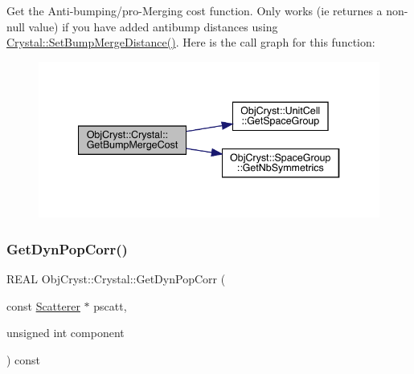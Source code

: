 Get the Anti-\/bumping/pro-\/\+Merging cost function. Only works (ie returnes a non-\/null value) if you have added antibump distances using \mbox{\hyperlink{class_obj_cryst_1_1_crystal_ad77bfe72588a64e306a5514535ed7404}{Crystal\+::\+Set\+Bump\+Merge\+Distance()}}. Here is the call graph for this function\+:
\nopagebreak
\begin{figure}[H]
\begin{center}
\leavevmode
\includegraphics[width=340pt]{class_obj_cryst_1_1_crystal_a9d7a5da6a0618589ee256a5bb8128ffa_cgraph}
\end{center}
\end{figure}
\mbox{\label{class_obj_cryst_1_1_crystal_a9328fa012a60adf6b2b17dcfba9f6906}} 
\subsubsection{\texorpdfstring{GetDynPopCorr()}{GetDynPopCorr()}}
{\footnotesize\ttfamily R\+E\+AL Obj\+Cryst\+::\+Crystal\+::\+Get\+Dyn\+Pop\+Corr (\begin{DoxyParamCaption}\item[{const \mbox{\hyperlink{class_obj_cryst_1_1_scatterer}{Scatterer}} $\ast$}]{pscatt,  }\item[{unsigned int}]{component }\end{DoxyParamCaption}) const}

